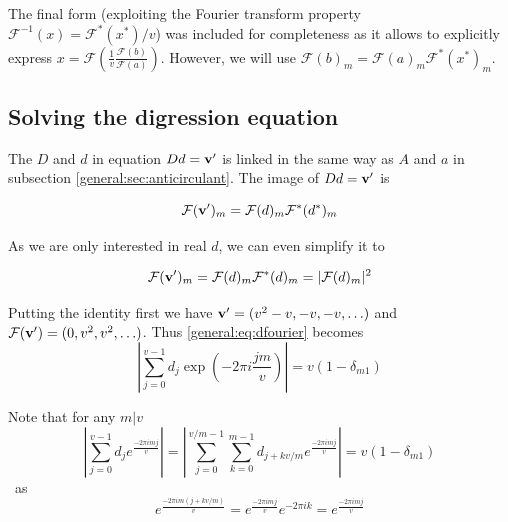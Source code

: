 \documentclass{article}
\theoremstyle{plain}
\theoremstyle{definition}
\theoremstyle{remark}
\begin{document}
                The final form (exploiting the Fourier transform property $\mathcal{F}^{-1}(x) = \mathcal{F}^*(x^*)/v$) was included for completeness as it allows to explicitly express $x = \mathcal{F} \left(\frac1v \frac{\mathcal{F}(b)}{\mathcal{F}(a)} \right)$. However, we will use $\mathcal{F} (b)_m = \mathcal{F}(a)_m \mathcal{F}^*(x^*)_m$.
            
            \subsection{Solving the digression equation}
                The $D$ and $d$ in equation $Dd=\bf v'$ is linked in the same way as $A$ and $a$ in subsection \ref{general:sec:anticirculant}. The image of $Dd=\bf v'$ is
                
                \begin{equation}
                    \mathcal{F} ({\bf v'})_m = \mathcal{F}(d)_m \mathcal{F^*}(d^*)_m
                \end{equation}

                As we are only interested in real $d$, we can even simplify it to
                
                \begin{equation}
                    \label{general:eq:dfourier}
                    \mathcal{F} ({\bf v'})_m = \mathcal{F}(d)_m \mathcal{F^*}(d)_m = |\mathcal{F}(d)_m|^2
                \end{equation}
                
                Putting the identity first we have ${\bf v'} = (v^2-v, -v, -v, \ldots)$ and $\mathcal{F}({\bf v'}) = (0,v^2,v^2,\ldots)$. Thus \eqref{general:eq:dfourier} becomes
                \begin{equation}
                    \left| \sum_{j=0}^{v-1} d_j \exp(-2\pi i \frac{jm}v) \right| = v (1-\delta_{m1})
                \end{equation}

                Note that for any $m | v$
                \begin{equation}
                    \label{general:eq:split_fourier}
                    \left| \sum_{j=0}^{v-1} d_j e^{\frac{-2\pi i m j}v} \right|
                    = \left| \sum_{j=0}^{v/m-1} \sum_{k=0}^{m-1}  d_{j+kv/m} e^{\frac{-2\pi i m j}v} \right|
                    =v (1-\delta_{m1})
                \end{equation}\
                as 
                \begin{equation}
                    e^{\frac{-2\pi i m (j+kv/m)}v} = e^{\frac{-2\pi i m j}v} e^{-2\pi i k} = e^{\frac{-2\pi i m j}v}
                \end{equation}
                
\end{document}

